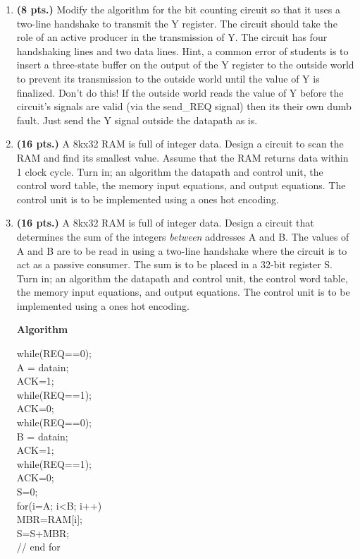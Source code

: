 \begin{enumerate}
\item {\bf (8 pts.)}
Modify the algorithm for the bit counting circuit so that it uses a 
two-line handshake to transmit the Y register.  The circuit should take
the role of an active producer in the transmission of Y.  The circuit
has four handshaking lines and two data lines.  Hint, a common
error of students is to insert a three-state buffer on the output of
the Y register to the outside world to prevent its transmission to
the outside world until the value of Y is finalized.  Don't do this!
If the outside world reads the value of Y before the circuit's signals
are valid (via the send\_REQ signal) then its their own dumb fault.
Just send the Y signal outside the datapath as is.

\item {\bf (16 pts.)} 
A 8kx32 RAM is full of integer data.  Design a circuit to scan
the RAM and find its smallest value.  Assume that the RAM 
returns data within 1 clock cycle.  
Turn in; an algorithm
the datapath and control unit,
the control word table,
the memory input equations, and
output equations.  
The control unit is to be implemented using a ones hot encoding.


\item {\bf (16 pts.)}
A 8kx32 RAM is full of integer data.  Design a
circuit that determines the sum of the integers {\em between} addresses
A and B.  The values of A and B are to be read in using a two-line
handshake where the circuit is to act as a passive consumer.  
The sum is to be placed in a 32-bit register S.
Turn in; an algorithm
the datapath and control unit,
the control word table,
the memory input equations, and
output equations.  
The control unit is to be implemented using a ones hot encoding.

\begin{solution} {

{\bf Algorithm}

while(REQ==0); \\
A = datain; \\
ACK=1; \\
while(REQ==1); \\
ACK=0; \\
while(REQ==0); \\
B = datain; \\
ACK=1; \\
while(REQ==1); \\
ACK=0; \\
S=0; \\
for(i=A; i<B; i++)  { \\
 MBR=RAM[i]; \\
 S=S+MBR; \\
} // end for \\

}
\end{solution}
\end{enumerate}
